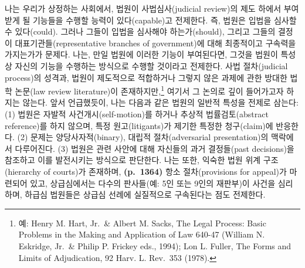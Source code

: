 \documentclass[a4paper,12pt,oneside]{article}  %
\begin{document}
나는 우리가 상정하는 사회에서, 법원이 사법심사(judicial review)의 제도
하에서 부여받게 될 기능들을 수행할 능력이 있다(capable)고 전제한다. 즉,
법원은 입법을 심사할 수 있다(could). 그러나 그들이 입법을 심사해야
하는가(should), 그리고 그들의 결정이 대표기관들(representative branches
of government)에 대해 최종적이고 구속력을 가지는가가 문제다. 나는, 만일
법원에 이러한 기능이 부여된다면, 그것을 법원이 특성상 자신의 기능을
수행하는 방식으로 수행할 것이라고 전제한다. 사법 절차(judicial
process)의 성격과, 법원이 제도적으로 적합하거나 그렇지 않은 과제에 관한
방대한 법학 논문(law review literature)이 존재하지만,\footnote{예: Henry
  M. Hart, Jr.~\& Albert M. Sacks, The Legal Process: Basic Problems in
  the Making and Application of Law 640-47 (William N. Eskridge, Jr.~\&
  Philip P. Frickey eds., 1994); Lon L. Fuller, The Forms and Limits of
  Adjudication, 92 Harv. L. Rev.~353 (1978).} 여기서 그 논의로 깊이
들어가고자 하지는 않는다. 앞서 언급했듯이, 나는 다음과 같은 법원의
일반적 특성을 전제로 삼는다: (1) 법원은 자발적 사건개시(self-motion)를
하거나 추상적 법률검토(abstract reference)를 하지 않으며, 특정
원고(litigants)가 제기한 특정한 청구(claim)에 반응한다. (2) 문제는
양당사자적(binary), 대립적 절차(adversarial presentation)의 맥락에서
다루어진다. (3) 법원은 관련 사안에 대해 자신들의 과거 결정들(past
decisions)을 참조하고 이를 발전시키는 방식으로 판단한다. 나는 또한,
익숙한 법원 위계 구조(hierarchy of courts)가 존재하며,
\textbf{(p.~1364)} 항소 절차(provisions for appeal)가 마련되어 있고,
상급심에서는 다수의 판사들(예: 5인 또는 9인의 재판부)이 사건을 심리하며,
하급심 법원들은 상급심 선례에 실질적으로 구속된다는 점도 전제한다.
\end{document}
